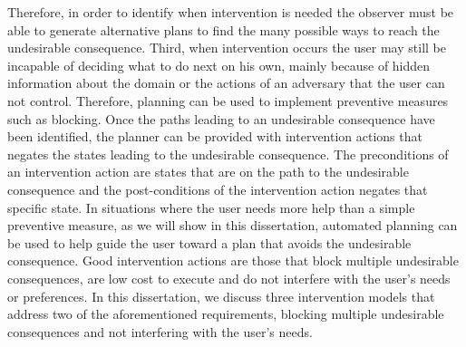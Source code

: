 Therefore, in order to identify when intervention is needed the observer must be able to generate alternative plans to find the many possible ways to reach the undesirable consequence. 
Third, when intervention occurs the user may still be incapable of deciding what to do next on his own, mainly because of hidden information about the domain or the actions of an adversary that the user can not control. 
Therefore, planning can be used to implement preventive measures such as blocking. 
Once the paths leading to an undesirable consequence have been identified, the planner can be provided with intervention actions that negates the states leading to the undesirable consequence. 
The preconditions of an intervention action are  states that are on the path to the undesirable consequence and the post-conditions of the intervention action negates that specific state. 
In situations where the user needs more help than a simple preventive measure, as we will show in this dissertation, automated planning can be used to help guide the user toward a plan that avoids the undesirable consequence.
Good intervention actions are those that block multiple undesirable consequences, are low cost to execute and do not interfere with the user’s needs or preferences. 
In this dissertation, we discuss three intervention models that address two of the aforementioned requirements, blocking multiple undesirable consequences and not interfering with the user's needs. 
